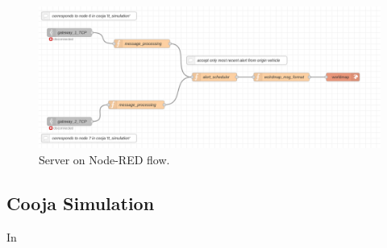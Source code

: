 \documentclass[]{article}
\begin{document}
\begin{figure}[h!]
	\includegraphics[scale=0.3]{./images/tt_server_arc.png}
	\caption{Server on Node-RED flow.}\label{tt-fig:2}
\end{figure}

\subsection{Cooja Simulation}
In
\end{document}
